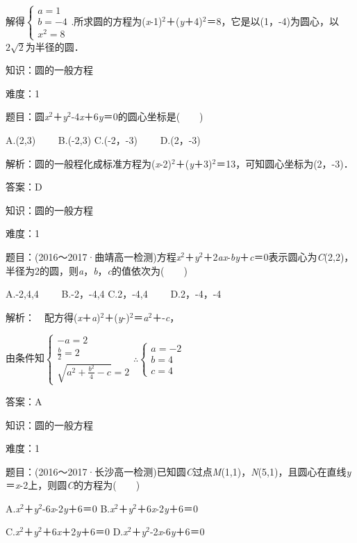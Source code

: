\documentclass{article} %
\begin{document}
解得$\left\{\begin{array}{r} a=1\\ b=-4\\ x^2=8 \end{array} \right.$.所求圆的方程为(\textit{x}-1)${}^{2}$＋(\textit{y}＋4)${}^{2}$＝8，它是以(1，-4)为圆心，以$2\sqrt{2}$为半径的圆．

知识：圆的一般方程

难度：1

题目：圆\textit{x}${}^{2}$＋\textit{y}${}^{2}$-4\textit{x}＋6\textit{y}＝0的圆心坐标是(　　)

A.(2,3)　　 B.(-2,3)  C.(-2，-3)　　 D.(2，-3)

解析：圆的一般程化成标准方程为(\textit{x}-2)${}^{2}$＋(\textit{y}＋3)${}^{2}$＝13，可知圆心坐标为(2，-3)．

答案：D

知识：圆的一般方程

难度：1

题目：(2016～2017·曲靖高一检测)方程\textit{x}${}^{2}$＋\textit{y}${}^{2}$＋2\textit{ax}-\textit{by}＋\textit{c}＝0表示圆心为\textit{C}(2,2)，半径为2的圆，则\textit{a}，\textit{b}，\textit{c}的值依次为(　　)

A.-2,4,4　　 B.-2，-4,4  C.2，-4,4　　 D.2，-4，-4

解析：　配方得(\textit{x}＋\textit{a})${}^{2}$＋(\textit{y}-)${}^{2}$＝\textit{a}${}^{2}$＋-\textit{c}，

由条件知$\left\{\begin{array}{r} -a=2\\ \frac{b}{2}=2\\ \sqrt{a^2+\frac{b^2}{4}-c}=2 \end{array} \right.$$\mathrm{\therefore}$$\left\{\begin{array}{r} a=-2\\ b=4\\ c=4 \end{array} \right.$

答案：A

知识：圆的一般方程

难度：1

题目：(2016～2017·长沙高一检测)已知圆\textit{C}过点\textit{M}(1,1)，\textit{N}(5,1)，且圆心在直线\textit{y}＝\textit{x}-2上，则圆\textit{C}的方程为(　　)

A.\textit{x}${}^{2}$＋\textit{y}${}^{2}$-6\textit{x}-2\textit{y}＋6＝0 B.\textit{x}${}^{2}$＋\textit{y}${}^{2}$＋6\textit{x}-2\textit{y}＋6＝0

C.\textit{x}${}^{2}$＋\textit{y}${}^{2}$＋6\textit{x}＋2\textit{y}＋6＝0 D.\textit{x}${}^{2}$＋\textit{y}${}^{2}$-2\textit{x}-6\textit{y}＋6＝0
\end{document}
